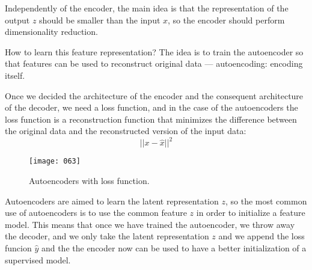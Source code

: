 Independently of the encoder, the main idea is that the representation of the output \(z\) should be smaller than the input \(x\), so the encoder should perform dimensionality reduction. 

How to learn this feature representation? The idea is to train the autoencoder so that features can be used to reconstruct original data --- autoencoding: encoding itself.

Once we decided the architecture of the encoder and the consequent architecture of the decoder, we need a loss function, and in the case of the autoencoders the loss function is a reconstruction function that minimizes the difference between the original data and the reconstructed version of the input data:
\begin{equation}
    ||x - \hat{x}||^2
\end{equation}
\begin{figure}[h!]
    \centering
    \texttt{[image: 063]}
    \caption{Autoencoders with loss function.}
    \label{fig:063}
\end{figure}

Autoencoders are aimed to learn the latent representation \(z\), so the most common use of autoencoders is to use the common feature \(z\) in order to initialize a feature model. This means that once we have trained the autoencoder, we throw away the decoder, and we only take the latent representation \(z\) and we append the loss funcion \(\hat{y}\) and the the encoder now can be used to have a better initialization of a supervised model.
